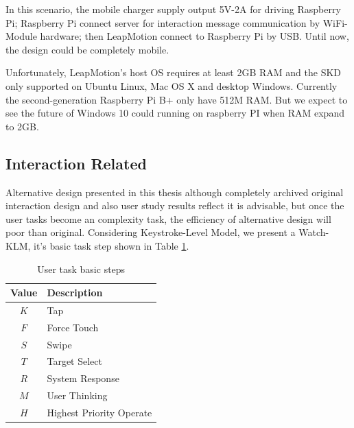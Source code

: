 In this scenario, the mobile charger supply output 5V-2A for driving Raspberry Pi; Raspberry Pi connect server for interaction message communication by WiFi-Module hardware; then LeapMotion connect to Raspberry Pi by USB. Until now, the design could be completely mobile.

Unfortunately, LeapMotion's host OS requires at least 2GB RAM and the SKD only supported on Ubuntu Linux, Mac OS X and desktop Windows. Currently the second-generation Raspberry Pi B+ only have 512M RAM. But we expect to see the future of Windows 10 could running on raspberry PI when RAM expand to 2GB.

\subsection{Interaction Related}


Alternative design presented in this thesis although completely archived original interaction design and also user study results reflect it is advisable, but once the user tasks become an complexity task, the efficiency of alternative design will poor than original. Considering Keystroke-Level Model\cite{Card:1980:KMU:358886.358895}, we present a Watch-KLM, it's basic task step shown in Table \ref{table:task}.

\begin{table}[H]
    \small
    \kaishu
    \centering
    \setlength{\belowcaptionskip}{10pt}
    \caption{User task basic steps}

    \begin{tabular}{c l}
        \toprule
        \textbf{Value}        & \textbf{Description} \\
        \hline
        $K$     & Tap \\
        $F$     & Force Touch \\
        $S$     & Swipe \\
        $T$     & Target Select \\
        $R$     & System Response \\
        $M$     & User Thinking \\
        $H$     & Highest Priority Operate \\
        \bottomrule
    \end{tabular}

    \label{table:task}
\end{table}

